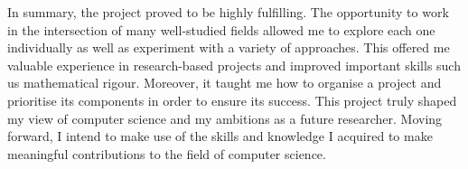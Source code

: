 In summary, the project proved to be highly fulfilling. The opportunity to work in the intersection
of many well-studied fields allowed me to explore each one individually as well as
experiment with a variety of approaches. This offered me valuable
experience in research-based projects and improved important skills such us mathematical rigour.
Moreover, it taught me how to organise a project and
prioritise its components in order to ensure its success.
This project truly shaped my view of computer science and
my ambitions as a future researcher. Moving forward,
I intend to make use of the skills and knowledge I acquired
to make meaningful contributions to the field of computer science.



